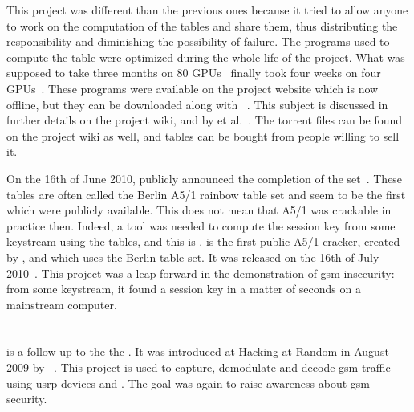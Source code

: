 {{      This project was different than the previous ones because it tried
      to allow anyone to work on the computation of the tables and share
      them, thus distributing the responsibility and diminishing the
      possibility of failure. The programs used to compute the table
      were optimized during the whole life of the project. What was
      supposed to take three months on 80 GPUs~\cite{nohl_gsm:_2009}
      finally took four weeks on four GPUs~\cite{nohl_breaking_2010}.
      These programs were available on the project website which is now
      offline, but they can be downloaded along with
      ~\cite{kraken_????}. This subject is discussed in
      further details on the project wiki, and by  et
      al.~\cite{glendrange_decoding_2010,srlabs_wiki_????}. The torrent
      files can be found on the project wiki as well, and tables can be
      bought from people willing to sell it.

      On the 16th of June 2010,  publicly
      announced the completion of the set~\cite{stevenson_[a51]_2010-1}.
      These tables are often called the Berlin A5/1 rainbow table set
      and seem to be the first which were publicly available. This does
      not mean that A5/1 was crackable in practice then. Indeed, a tool
      was needed to compute the session key from some keystream using
      the tables, and this is .  is the first
      public A5/1 cracker, created by , and
      which uses the Berlin table set. It was released on the 16th of
      July 2010~\cite{stevenson_[a51]_2010}. This project was a leap
      forward in the demonstration of \gls{gsm} insecurity: from some
      keystream, it found a session key in a matter of seconds on a
      mainstream computer.
      
    \section{}
    \label{sec:airprobe}

       is a follow up to the \gls{thc} . It was introduced at Hacking at Random in August 2009 by
      ~\cite{welte_airprobe:_2009,airprobe_????}.
      This project is used to capture, demodulate and decode \gls{gsm}
      traffic using \gls{usrp} devices and . The goal
      was again to raise awareness about \gls{gsm} security.

}}

